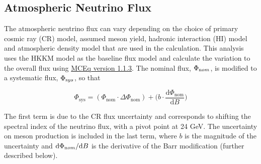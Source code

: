 \subsection{Atmospheric Neutrino Flux}
\label{sec:flux_systs}

The atmospheric neutrino flux can vary depending on the choice of primary cosmic ray (CR) model, assumed meson yield, hadronic interaction (HI) model and atmospheric density model that are used in the calculation. This analysis uses the HKKM model as the baseline flux model and calculate the variation to the overall flux using \href{https://github.com/afedynitch/MCEq}{MCEq version 1.1.3}. The nominal flux, $\Phi_{\rm nom}$, is modified to a systematic flux, $\Phi_{\rm sys}$, so that

$$\Phi_{\mathrm{sys}} = (\Phi_{\mathrm{nom}} \cdot \Delta \Phi_{\mathrm{nom}}) + \bigg( b \cdot \frac{\mathrm{d} \Phi_{\mathrm{nom}}}{\mathrm{d}B} \bigg)$$

The first term is due to the CR flux uncertainty and corresponds to shifting the spectral index of the neutrino flux, with a pivot point at 24 GeV. The uncertainty on meson production is included in the last term, where $b$ is the magnitude of the uncertainty and $ {\rm d} \Phi_{\rm nom} / {\rm d}B $ is the derivative of the Barr modification  (further described below). 

